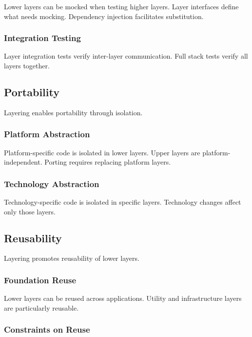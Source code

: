 \documentclass[11pt]{article}
\begin{document}
Lower layers can be mocked when testing higher layers. Layer interfaces define what needs mocking. Dependency injection facilitates substitution.

\subsubsection{Integration Testing}

Layer integration tests verify inter-layer communication. Full stack tests verify all layers together.

\subsection{Portability}

Layering enables portability through isolation.

\subsubsection{Platform Abstraction}

Platform-specific code is isolated in lower layers. Upper layers are platform-independent. Porting requires replacing platform layers.

\subsubsection{Technology Abstraction}

Technology-specific code is isolated in specific layers. Technology changes affect only those layers.

\subsection{Reusability}

Layering promotes reusability of lower layers.

\subsubsection{Foundation Reuse}

Lower layers can be reused across applications. Utility and infrastructure layers are particularly reusable.

\subsubsection{Constraints on Reuse}
\end{document}
